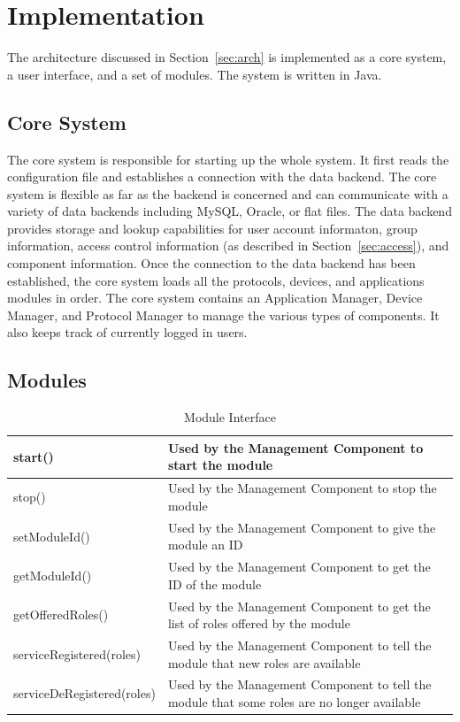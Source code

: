 \section{Implementation}
\label{sec:implementation}
The architecture discussed in Section~\ref{sec:arch} is implemented as a core
system, a user interface, and a set of modules. The system is written in Java.
\subsection{Core System}
\label{sec:core}
The core system is responsible for starting up the whole system. It first reads
the configuration file and establishes a connection with the data backend. The
core system is flexible as far as the backend is concerned and can communicate
with a variety of data backends including MySQL, Oracle, or flat files. The data
backend provides storage and lookup capabilities for user account informaton,
group information, access control information (as described in
Section~\ref{sec:access}), and component information. Once the connection to
the data backend has been established, the core system loads all the protocols,
devices, and applications modules in order. The core system contains an
Application Manager, Device Manager, and Protocol Manager to manage the various
types of components. It also keeps track of currently logged in users.
\subsection{Modules}
\label{sec:modules}
\begin{table}
\begin{center}
\begin{tabular}{| p{4cm} | p{3cm} |}
\hline
start() & Used by the Management Component to start the module \\ \hline
stop() & Used by the Management Component to stop the module \\ \hline
setModuleId() & Used by the Management Component to give the module an ID \\ \hline
getModuleId() & Used by the Management Component to get the ID of the module \\ \hline
getOfferedRoles() & Used by the Management Component to get the list of roles
offered by the module \\ \hline
serviceRegistered(roles) & Used by the Management Component to tell
the module that new roles are available \\ \hline
serviceDeRegistered(roles) & Used by the Management Component to tell
the module that some roles are no longer available \\ \hline
\end{tabular}
\end{center}
\caption{Module Interface}
\label{tab:module}
\end{table}

